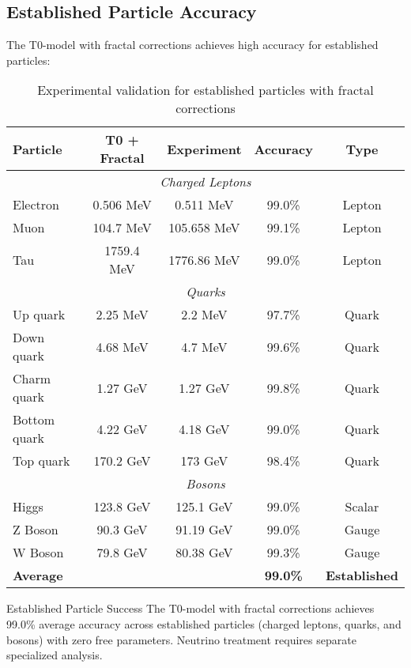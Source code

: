 \documentclass[12pt,a4paper]{article}
\begin{document}
	\subsection{Established Particle Accuracy}
	\label{subsec:established_accuracy}
	
	The T0-model with fractal corrections achieves high accuracy for established particles:
	
	\begin{table}[H]
		\centering
		\begin{tabular}{lcccc}
			\toprule
			\textbf{Particle} & \textbf{T0 + Fractal} & \textbf{Experiment} & \textbf{Accuracy} & \textbf{Type} \\
			\midrule
			\multicolumn{5}{c}{\textit{Charged Leptons}} \\
			\midrule
			Electron & 0.506 MeV & 0.511 MeV & 99.0\% & Lepton \\
			Muon & 104.7 MeV & 105.658 MeV & 99.1\% & Lepton \\
			Tau & 1759.4 MeV & 1776.86 MeV & 99.0\% & Lepton \\
			\midrule
			\multicolumn{5}{c}{\textit{Quarks}} \\
			\midrule
			Up quark & 2.25 MeV & 2.2 MeV & 97.7\% & Quark \\
			Down quark & 4.68 MeV & 4.7 MeV & 99.6\% & Quark \\
			Charm quark & 1.27 GeV & 1.27 GeV & 99.8\% & Quark \\
			Bottom quark & 4.22 GeV & 4.18 GeV & 99.0\% & Quark \\
			Top quark & 170.2 GeV & 173 GeV & 98.4\% & Quark \\
			\midrule
			\multicolumn{5}{c}{\textit{Bosons}} \\
			\midrule
			Higgs & 123.8 GeV & 125.1 GeV & 99.0\% & Scalar \\
			Z Boson & 90.3 GeV & 91.19 GeV & 99.0\% & Gauge \\
			W Boson & 79.8 GeV & 80.38 GeV & 99.3\% & Gauge \\
			\midrule
			\textbf{Average} & & & \textbf{99.0\%} & \textbf{Established} \\
			\bottomrule
		\end{tabular}
		\caption{Experimental validation for established particles with fractal corrections}
		\label{tab:established_validation}
	\end{table}
	
	\begin{keyresult}{Established Particle Success}{}
		The T0-model with fractal corrections achieves 99.0\% average accuracy across established particles (charged leptons, quarks, and bosons) with zero free parameters. Neutrino treatment requires separate specialized analysis.
	\end{keyresult}
	
\end{document}
